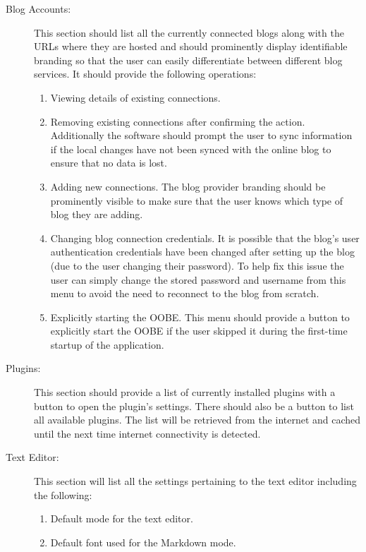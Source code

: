 \begin{description}
    \item [Blog Accounts:] This section should list all the currently connected blogs along with the URLs where they are
          hosted and should prominently display identifiable branding so that the user can easily differentiate between
          different blog services. It should provide the following operations:
        \begin{enumerate}
            \item {Viewing details of existing connections.}
            \item {Removing existing connections after confirming the action. Additionally the software should prompt
                   the user to sync information if the local changes have not been synced with the online blog to
                   ensure that no data is lost.}
            \item {Adding new connections. The blog provider branding should be prominently visible to make sure that
                   the user knows which type of blog they are adding.}
            \item {Changing blog connection credentials. It is possible that the blog's user authentication credentials
                   have been changed after setting up the blog (due to the user changing their password). To help fix
                   this issue the user can simply change the stored password and username from this menu to avoid the
                   need to reconnect to the blog from scratch.}
            \item {Explicitly starting the OOBE. This menu should provide a button to explicitly start the OOBE if the
                   user skipped it during the first-time startup of the application.}
        \end{enumerate}
    \item [Plugins:] This section should provide a list of currently installed plugins with a button to open the
          plugin's settings. There should also be a button to list all available plugins. The list will be retrieved
          from the internet and cached until the next time internet connectivity is detected.
    \item [Text Editor:] This section will list all the settings pertaining to the text editor including the following:
        \begin{enumerate}
            \item {Default mode for the text editor.}
            \item {Default font used for the Markdown mode.}

\end{enumerate}
\end{description}
